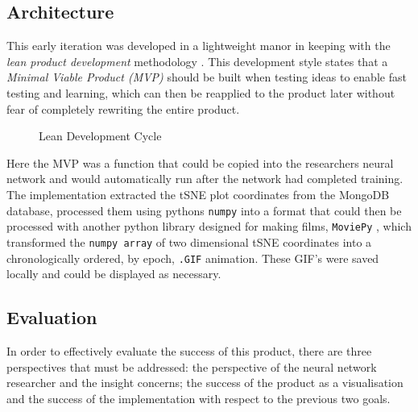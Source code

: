 \documentclass[a4paper,11pt,titlepage]{article}
\begin{document}
	
	
	\subsection{Architecture}
	This early iteration was developed in a lightweight manor in keeping with the \textit{lean product development} methodology \cite{}. This development style states that a \textit{Minimal Viable Product (MVP)} should be built when testing ideas to enable fast testing and learning, which can then be reapplied to the product later without fear of completely rewriting the entire product.
	\par 
		
	\begin{figure}[H]
    			\caption{Lean Development Cycle}%
	\end{figure}	
	
	Here the MVP was a function that could be copied into the researchers neural network and would automatically run after the network had completed training. The implementation extracted the tSNE plot coordinates from the MongoDB database, processed them using pythons \texttt{numpy} into a format that could then be processed with another python library designed for making films, \texttt{MoviePy} \cite{}, which transformed the \texttt{numpy array} of two dimensional tSNE coordinates into a chronologically ordered, by epoch, \texttt{.GIF} animation. These GIF's were saved locally and could be displayed as necessary.
	
	\subsection{Evaluation}
	In order to effectively evaluate the success of this product, there are three perspectives that must be addressed: the perspective of the neural network researcher and the insight concerns; the success of the product as a visualisation and the success of the implementation with respect to the previous two goals.
	
\end{document}
